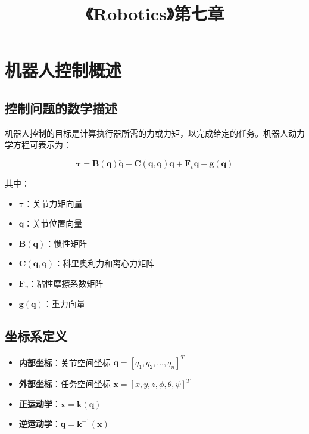 \documentclass[12pt,a4paper]{article}
\title{\textbf{《Robotics》第七章}}
\author{}
\date{}
\begin{document}
\maketitle

\section{机器人控制概述}

\subsection{控制问题的数学描述}

机器人控制的目标是计算执行器所需的力或力矩，以完成给定的任务。机器人动力学方程可表示为：

\begin{equation}
\boldsymbol{\tau} = \mathbf{B}(\mathbf{q})\ddot{\mathbf{q}} + \mathbf{C}(\mathbf{q},\dot{\mathbf{q}})\dot{\mathbf{q}} + \mathbf{F}_v\dot{\mathbf{q}} + \mathbf{g}(\mathbf{q})
\label{eq:robot_dynamics}
\end{equation}

其中：
\begin{itemize}
    \item $\boldsymbol{\tau}$：关节力矩向量
    \item $\mathbf{q}$：关节位置向量
    \item $\mathbf{B}(\mathbf{q})$：惯性矩阵
    \item $\mathbf{C}(\mathbf{q},\dot{\mathbf{q}})$：科里奥利力和离心力矩阵
    \item $\mathbf{F}_v$：粘性摩擦系数矩阵
    \item $\mathbf{g}(\mathbf{q})$：重力向量
\end{itemize}

\subsection{坐标系定义}

\begin{itemize}
    \item \textbf{内部坐标}：关节空间坐标 $\mathbf{q} = [q_1, q_2, \dots, q_n]^T$
    \item \textbf{外部坐标}：任务空间坐标 $\mathbf{x} = [x, y, z, \phi, \theta, \psi]^T$
    \item \textbf{正运动学}：$\mathbf{x} = \mathbf{k}(\mathbf{q})$
    \item \textbf{逆运动学}：$\mathbf{q} = \mathbf{k}^{-1}(\mathbf{x})$
\end{itemize}
\end{document}
